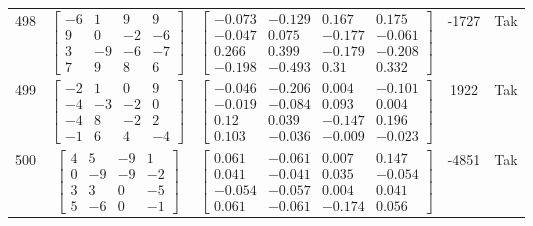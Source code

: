 \documentclass[a4paper,12pt]{article}
\begin{document}
\begin{tabular}{c c c c c}
498
&
$\begin{bmatrix} -6 & 1 & 9 & 9 \\ 9 & 0 & -2 & -6 \\ 3 & -9 & -6 & -7 \\ 7 & 9 & 8 & 6 \end{bmatrix}$
&
$\begin{bmatrix} -0.073 & -0.129 & 0.167 & 0.175 \\ -0.047 & 0.075 & -0.177 & -0.061 \\ 0.266 & 0.399 & -0.179 & -0.208 \\ -0.198 & -0.493 & 0.31 & 0.332 \end{bmatrix}$
&
-1727
&
Tak
\\
499
&
$\begin{bmatrix} -2 & 1 & 0 & 9 \\ -4 & -3 & -2 & 0 \\ -4 & 8 & -2 & 2 \\ -1 & 6 & 4 & -4 \end{bmatrix}$
&
$\begin{bmatrix} -0.046 & -0.206 & 0.004 & -0.101 \\ -0.019 & -0.084 & 0.093 & 0.004 \\ 0.12 & 0.039 & -0.147 & 0.196 \\ 0.103 & -0.036 & -0.009 & -0.023 \end{bmatrix}$
&
1922
&
Tak
\\
500
&
$\begin{bmatrix} 4 & 5 & -9 & 1 \\ 0 & -9 & -9 & -2 \\ 3 & 3 & 0 & -5 \\ 5 & -6 & 0 & -1 \end{bmatrix}$
&
$\begin{bmatrix} 0.061 & -0.061 & 0.007 & 0.147 \\ 0.041 & -0.041 & 0.035 & -0.054 \\ -0.054 & -0.057 & 0.004 & 0.041 \\ 0.061 & -0.061 & -0.174 & 0.056 \end{bmatrix}$
&
-4851
&
Tak
\\
\end{tabular} \egroup \newpage
\end{document}
